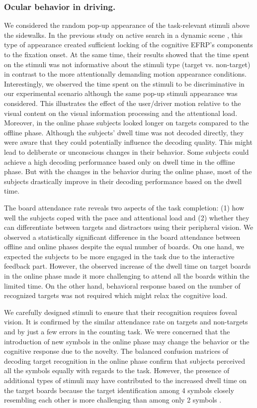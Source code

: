 \documentclass[12pt]{iopart}
\begin{document}
\subsubsection*{Ocular behavior in driving.}
We considered the random pop-up appearance of the task-relevant
stimuli above the sidewalks.  In the previous study
on active search in a dynamic scene \cite{uscumlic_active_2016},
this type of appearance created sufficient locking
of the cognitive EFRP's components to the fixation onset.
At the same time, their results showed that the time spent
on the stimuli was not informative about
the stimuli type (target vs. non-target) in contrast
to the more attentionally demanding motion appearance conditions.   
Interestingly, we observed  the time spent on the stimuli  to be
discriminative in our experimental scenario although the same
pop-up stimuli appearance was considered.
This illustrates the effect of the user/driver motion
relative to the visual content on the visual information
processing and the attentional load. Moreover, in the online phase
subjects looked longer on targets compared to the offline phase.
Although the subjects' dwell time was not decoded directly, they were aware
that they could potentially influence the decoding quality. This might
lead to deliberate or unconscious changes in their behavior.
Some subjects could achieve a high decoding performance based
only on dwell time in the offline phase. But with the changes in the behavior
during the online phase, most of the subjects drastically improve in their decoding performance
based on the dwell time.


The board attendance rate reveals two aspects of the task completion:
(1) how well the subjects coped with the pace and attentional load
and (2) whether they can differentiate between targets and distractors
using their peripheral vision.
We observed a statistically significant difference in the board attendance
between offline and online phases despite the equal number of boards.
On one hand, we expected the subjects to 
be more engaged in the task due to the interactive feedback part.
However, the observed increase of the dwell time on target boards 
in the online phase made it more challenging to attend all
the boards within the limited time.
On the other hand, behavioral response based on the number of recognized targets
was not required which might relax the cognitive load.

We carefully designed stimuli
to ensure that their recognition requires foveal vision.
It is confirmed by the similar
attendance rate on targets and non-targets and 
by just a few errors in the counting task.
We were concerned that the introduction of new symbols in the online phase
may change the behavior or the cognitive response due to the novelty.
The balanced confusion matrices of decoding target recognition in the online phase
confirm that subjects perceived all the symbols equally with regards
to the task. However, the presence of additional types of stimuli 
may have contributed to the increased dwell time 
on the target boards because the target identification 
among 4 symbols closely resembling each other 
is more challenging than among only 2 symbols
\cite{dick_processing_1971,alegria_time_1970}.
\end{document}
